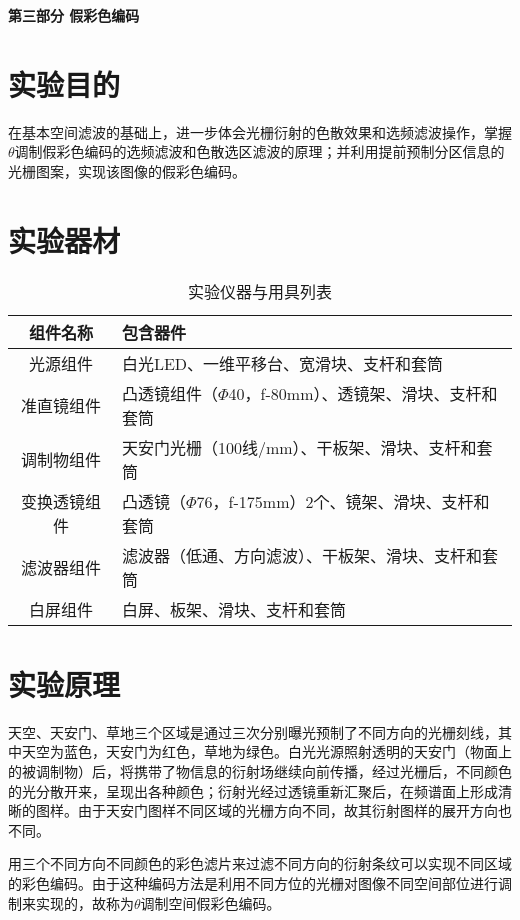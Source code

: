 \documentclass[12pt]{article}
\begin{document}
\begin{center}
    {\Large \textbf{第三部分 \quad 假彩色编码}}
\end{center}

\setcounter{section}{0}
\section{实验目的}
在基本空间滤波的基础上，进一步体会光栅衍射的色散效果和选频滤波操作，掌握$\theta$调制假彩色编码的选频滤波和色散选区滤波的原理；并利用提前预制分区信息的光栅图案，实现该图像的假彩色编码。

\section{实验器材}
\begin{table}[htbp]
    \centering
    \begin{tabular}[pos]{|c|l|}
        \hline
        组件名称 & 包含器件 \\
        \hline
        光源组件 & 白光LED、一维平移台、宽滑块、支杆和套筒 \\
        \hline
        准直镜组件 & 凸透镜组件（$\Phi$40，f-80mm）、透镜架、滑块、支杆和套筒 \\
        \hline
        调制物组件 & 天安门光栅（100线/mm）、干板架、滑块、支杆和套筒 \\
        \hline
        变换透镜组件 & 凸透镜（$\Phi$76，f-175mm）2个、镜架、滑块、支杆和套筒 \\
        \hline
        滤波器组件 & 滤波器（低通、方向滤波）、干板架、滑块、支杆和套筒 \\
        \hline
        白屏组件 & 白屏、板架、滑块、支杆和套筒 \\
        \hline
    \end{tabular}
    \caption{实验仪器与用具列表}
\end{table}

\section{实验原理}
天空、天安门、草地三个区域是通过三次分别曝光预制了不同方向的光栅刻线，其中天空为蓝色，天安门为红色，草地为绿色。白光光源照射透明的天安门（物面上的被调制物）后，将携带了物信息的衍射场继续向前传播，经过光栅后，不同颜色的光分散开来，呈现出各种颜色；衍射光经过透镜重新汇聚后，在频谱面上形成清晰的图样。由于天安门图样不同区域的光栅方向不同，故其衍射图样的展开方向也不同。

用三个不同方向不同颜色的彩色滤片来过滤不同方向的衍射条纹可以实现不同区域的彩色编码。由于这种编码方法是利用不同方位的光栅对图像不同空间部位进行调制来实现的，故称为$\theta$调制空间假彩色编码。
\end{document}
